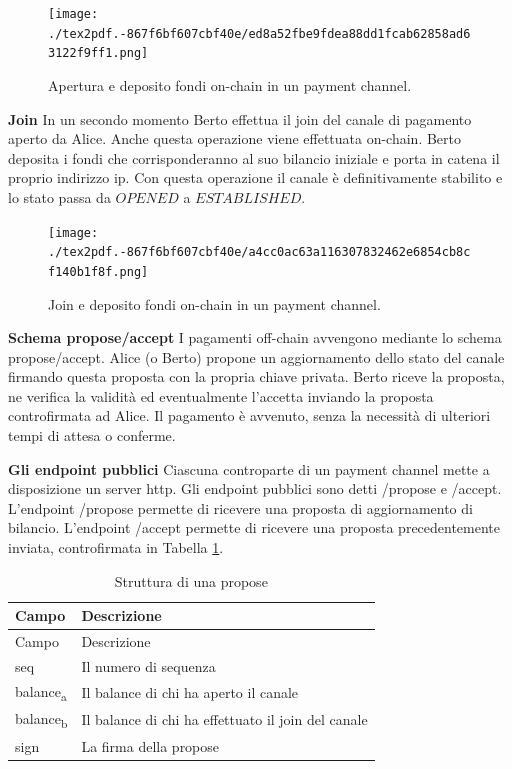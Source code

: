 \documentclass[12pt,italian,]{book}
\begin{document}
\begin{figure}
\centering
\texttt{[image: ./tex2pdf.-867f6bf607cbf40e/ed8a52fbe9fdea88dd1fcab62858ad63122f9ff1.png]}
\caption{Apertura e deposito fondi on-chain in un payment channel.}
\end{figure}

\textbf{\textbf{Join}} In un secondo momento Berto effettua il join del canale di pagamento aperto da Alice. Anche questa operazione viene effettuata on-chain. Berto deposita i fondi che corrisponderanno al suo bilancio iniziale e porta in catena il proprio indirizzo ip. Con questa operazione il canale è definitivamente stabilito e lo stato passa da \(OPENED\) a \(ESTABLISHED\).

\begin{figure}
\centering
\texttt{[image: ./tex2pdf.-867f6bf607cbf40e/a4cc0ac63a116307832462e6854cb8cf140b1f8f.png]}
\caption{Join e deposito fondi on-chain in un payment channel.}
\end{figure}

\textbf{\textbf{Schema propose/accept}} I pagamenti off-chain avvengono mediante lo schema propose/accept. Alice (o Berto) propone un aggiornamento dello stato del canale firmando questa proposta con la propria chiave privata. Berto riceve la proposta, ne verifica la validità ed eventualmente l'accetta inviando la proposta controfirmata ad Alice. Il pagamento è avvenuto, senza la necessità di ulteriori tempi di attesa o conferme.

\textbf{\textbf{Gli endpoint pubblici}} Ciascuna controparte di un payment channel mette a disposizione un server http. Gli endpoint pubblici sono detti /propose e /accept. L'endpoint /propose permette di ricevere una proposta di aggiornamento di bilancio. L'endpoint /accept permette di ricevere una proposta precedentemente inviata, controfirmata in Tabella \protect\hyperlink{struct_propose}{1}.

\begin{longtable}[]{@{}ll@{}}
\caption{\protect\hypertarget{struct_propose}{}{}Struttura di una propose}\tabularnewline
\toprule
Campo & Descrizione\tabularnewline
\midrule
\endfirsthead
\toprule
Campo & Descrizione\tabularnewline
\midrule
\endhead
seq & Il numero di sequenza\tabularnewline
balance\textsubscript{a} & Il balance di chi ha aperto il canale\tabularnewline
balance\textsubscript{b} & Il balance di chi ha effettuato il join del canale\tabularnewline
sign & La firma della propose\tabularnewline
\bottomrule
\end{longtable}
\end{document}
